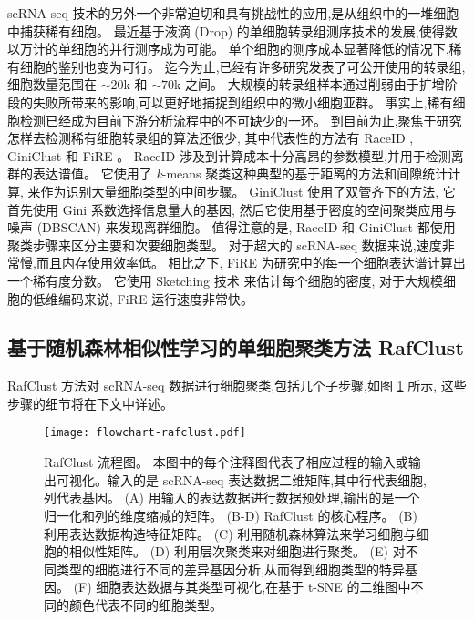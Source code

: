 scRNA-seq 技术的另外一个非常迫切和具有挑战性的应用,是从组织中的一堆细胞中捕获稀有细胞。
最近基于液滴 (Drop) 的单细胞转录组测序技术的发展,使得数以万计的单细胞的并行测序成为可能。
单个细胞的测序成本显著降低的情况下,稀有细胞的鉴别也变为可行。
迄今为止,已经有许多研究发表了可公开使用的转录组,细胞数量范围在 ${\sim} 20$k 和 ${\sim} 70$k 之间。
大规模的转录组样本通过削弱由于扩增阶段的失败所带来的影响,可以更好地捕捉到组织中的微小细胞亚群。
事实上,稀有细胞检测已经成为目前下游分析流程中的不可缺少的一环。
到目前为止,聚焦于研究怎样去检测稀有细胞转录组的算法还很少,
其中代表性的方法有 RaceID , GiniClust  和 FiRE 。
RaceID 涉及到计算成本十分高昂的参数模型,并用于检测离群的表达谱值。
它使用了 \textit{k}-means 聚类这种典型的基于距离的方法和间隙统计计算,
来作为识别大量细胞类型的中间步骤。
 GiniClust 使用了双管齐下的方法,
它首先使用 Gini 系数选择信息量大的基因,
然后它使用基于密度的空间聚类应用与噪声 (DBSCAN)  来发现离群细胞。
值得注意的是, RaceID 和 GiniClust 都使用聚类步骤来区分主要和次要细胞类型。
对于超大的 scRNA-seq 数据来说,速度非常慢,而且内存使用效率低。
相比之下, FiRE 为研究中的每一个细胞表达谱计算出一个稀有度分数。
它使用 Sketching 技术 来估计每个细胞的密度,
对于大规模细胞的低维编码来说, FiRE 运行速度非常快。

\subsection{基于随机森林相似性学习的单细胞聚类方法 RafClust}
\label{sec:method}

RafClust 方法对 scRNA-seq 数据进行细胞聚类,包括几个子步骤,如图 \ref{fig:rafclust} 所示, 这些步骤的细节将在下文中详述。
\begin{figure}[!htbp]
    \centering
    \texttt{[image: flowchart-rafclust.pdf]}
    \caption{RafClust 流程图。
    本图中的每个注释图代表了相应过程的输入或输出可视化。输入的是 scRNA-seq 表达数据二维矩阵,其中行代表细胞,列代表基因。
    (A) 用输入的表达数据进行数据预处理,输出的是一个归一化和列的维度缩减的矩阵。
    (B-D) RafClust 的核心程序。
    (B) 利用表达数据构造特征矩阵。
    (C) 利用随机森林算法来学习细胞与细胞的相似性矩阵。
    (D) 利用层次聚类来对细胞进行聚类。
    (E) 对不同类型的细胞进行不同的差异基因分析,从而得到细胞类型的特异基因。
    (F) 细胞表达数据与其类型可视化,在基于 t-SNE 的二维图中不同的颜色代表不同的细胞类型。
    }
    \label{fig:rafclust}
\end{figure}

